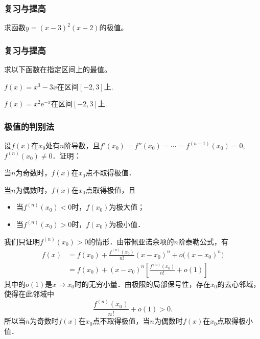 \documentclass[14pt,notheorems,leqno,xcolor={rgb}]{beamer} %
\begin{document}

\begin{oframe}
\frametitle{复习与提高}
\begin{review}
求函数$y=(x-3)^2(x-2)$的极值。
\end{review}
\end{oframe}

\begin{oframe}
\frametitle{复习与提高}
\begin{review}
求以下函数在指定区间上的最值。
\begin{enumlite}
  \item $f(x)=x^3-3x$在区间$[-2,3]$上.
  \item $f(x)=x^2\mathrm{e}^{-x}$在区间$[-2,3]$上.
\end{enumlite}
\end{review}
\end{oframe}

\begin{iframe}
\frametitle{极值的判别法}
\begin{example*}
设$f(x)$在$x_0$处有$n$阶导数，且$f'(x_0)=f''(x_0)=\cdots=f^{(n-1)}(x_0)=0$, $f^{(n)}(x_0)\neq0$．证明：\unskip
\begin{enumzero}
  \item 当$n$为奇数时，$f(x)$在$x_0$点不取得极值．
  \item 当$n$为偶数时，$f(x)$在$x_0$点取得极值，且
  \begin{itemize}
    \item 当$f^{(n)}(x_0)<0$时，$f(x_0)$为极大值；
    \item 当$f^{(n)}(x_0)>0$时，$f(x_0)$为极小值．
  \end{itemize}
\end{enumzero}
\end{example*}
\end{iframe}

\begin{iframe}
\begin{solution}
我们只证明$f^{(n)}(x_0)>0$的情形．\pause 由带佩亚诺余项的$n$阶泰勒公式，有
\begin{align*}
f(x)&=f(x_0)+\frac{f^{(n)}(x_0)}{n!}(x-x_0)^n+o\big((x-x_0)^n\big)\\
&=f(x_0)+(x-x_0)^n\left[\frac{f^{(n)}(x_0)}{n!}+o(1)\right]
\end{align*}\pause
其中的$o(1)$是$x\to x_0$时的无穷小量．\pause 由极限的局部保号性，存在$x_0$的去心邻域，%
使得在此邻域中$$\frac{f^{(n)}(x_0)}{n!}+o(1)>0.$$\pause
所以当$n$为奇数时$f(x)$在$x_0$点不取得极值，当$n$为偶数时$f(x)$在$x_0$点取得极小值．
\end{solution}
\end{iframe}
\end{document}

